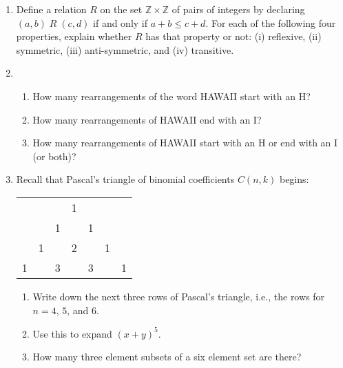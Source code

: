\documentclass[11pt]{article}
\begin{document}
\begin{enumerate}
\item Define a relation $R$ on the set $\mathbb{Z} \times \mathbb{Z}$ of pairs of integers by declaring $(a,b) \; R \; (c,d)$ if and only if $a+b \leq c+d$. For each of the following four properties, explain whether $R$ has that property or not: (i) reflexive, (ii) symmetric, (iii) anti-symmetric, and (iv) transitive.

\item \begin{enumerate}
\item How many rearrangements of the word HAWAII start with an H?
\item How many rearrangements of HAWAII end with an I?
\item How many rearrangements of HAWAII start with an H or end with an I (or both)?
\end{enumerate}

\item Recall that Pascal's triangle of binomial coefficients $C(n,k)$ begins:
\begin{center}
\begin{tabular}{c c c c c c c}
 & & & 1 & & & \\
 & & 1 & & 1 & & \\
 & 1 && 2 && 1 & \\
 1 && 3 && 3 && 1
\end{tabular}
\end{center}
\begin{enumerate}
\item Write down the next three rows of Pascal's triangle, i.e., the rows for $n=4$, $5$, and $6$.
\item Use this to expand $(x+y)^5$.
\item How many three element subsets of a six element set are there?
\end{enumerate}

\end{enumerate}
\end{document}
